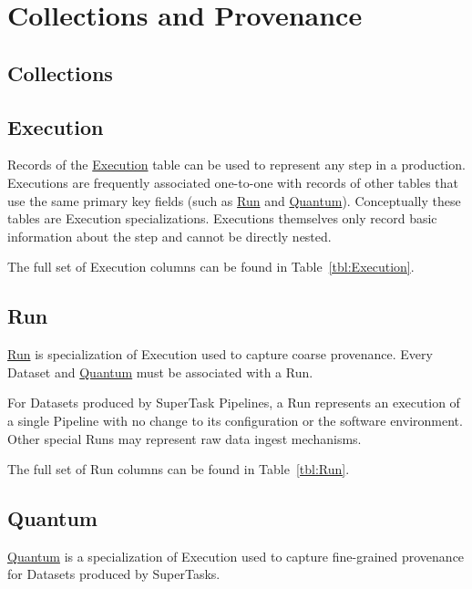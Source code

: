 \documentclass[DM,toc]{lsstdoc}
\newcommand{\tblref}[1]{\hyperref[tbl:#1]{#1}}
\newcommand{\coltable}[1]{
    \begin{table}[!htb]
        {\footnotesize
        }
        \caption{#1 Columns}
        \label{tbl:#1}
    \end{table}
}
\begin{document}
\section{Collections and Provenance}
\label{sec:collections-and-provenance}

\subsection{Collections}
\label{sec:collections}

\coltable{DatasetCollection}

\subsection{Execution}
\label{sec:excution}

Records of the \tblref{Execution} table can be used to represent any step in a production.
Executions are frequently associated one-to-one with records of other tables that use the same primary key fields (such as \hyperref[sec:run]{Run} and \hyperref[sec:quantum]{Quantum}).
Conceptually these tables are Execution specializations.
Executions themselves only record basic information about the step and cannot be directly nested.

The full set of Execution columns can be found in Table~\ref{tbl:Execution}.

\coltable{Execution}

\subsection{Run}
\label{sec:run}

\tblref{Run} is specialization of Execution used to capture coarse provenance.
Every Dataset and \hyperref[sec:quantum]{Quantum} must be associated with a Run.

For Datasets produced by SuperTask Pipelines, a Run represents an execution of a single Pipeline with no change to its configuration or the software environment.
Other special Runs may represent raw data ingest mechanisms.

The full set of Run columns can be found in Table~\ref{tbl:Run}.

\coltable{Run}

\subsection{Quantum}
\label{sec:quantum}

\tblref{Quantum} is a specialization of Execution used to capture fine-grained provenance for Datasets produced by SuperTasks.
\end{document}
